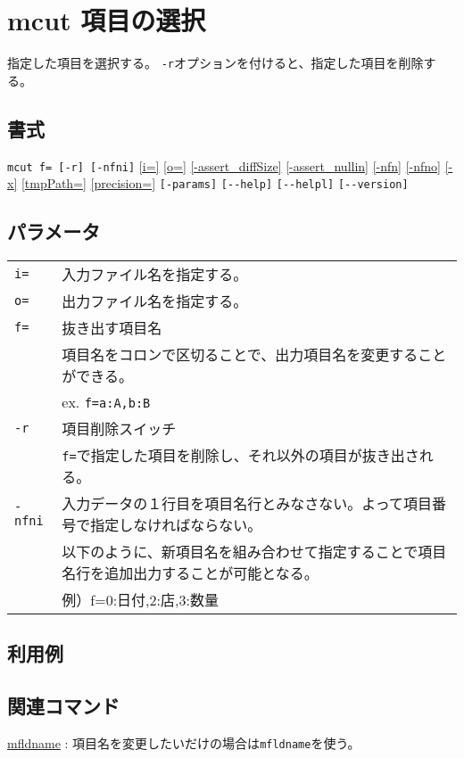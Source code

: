 
%

\section{mcut 項目の選択\label{sect:mcut}}
指定した項目を選択する。
\verb|-r|オプションを付けると、指定した項目を削除する。

\subsection*{書式}
\verb|mcut f= [-r] [-nfni]|
\hyperref[sect:option_i]{[i=]}
\hyperref[sect:option_o]{[o=]}
\hyperref[sect:option_assert_diffSize]{[-assert\_diffSize]}
\hyperref[sect:option_assert_nullin]{[-assert\_nullin]}
\hyperref[sect:option_nfn]{[-nfn]} 
\hyperref[sect:option_nfno]{[-nfno]}  
\hyperref[sect:option_x]{[-x]}
\hyperref[sect:option_option_tmppath]{[tmpPath=]}
\hyperref[sect:option_precision]{[precision=]}
\verb|[-params]|
\verb|[--help]|
\verb|[--helpl]|
\verb|[--version]|\\

\subsection*{パラメータ}
\begin{table}[htbp]
{\small
\begin{tabular}{ll}
\verb|i=|    & 入力ファイル名を指定する。\\
\verb|o=|    & 出力ファイル名を指定する。\\
\verb|f=|    & 抜き出す項目名\\
             & 項目名をコロンで区切ることで、出力項目名を変更することができる。\\
             & ex. \verb|f=a:A,b:B| \\
\verb|-r|    & 項目削除スイッチ\\
             & \verb|f=|で指定した項目を削除し、それ以外の項目が抜き出される。\\
\verb|-nfni| & 入力データの１行目を項目名行とみなさない。よって項目番号で指定しなければならない。\\
             & 以下のように、新項目名を組み合わせて指定することで項目名行を追加出力することが可能となる。\\
             & 例）f=0:日付,2:店,3:数量 \\
\end{tabular} 
}
\end{table} 

\subsection*{利用例}

\subsection*{関連コマンド}
\hyperref[sect:mfldname]{mfldname} : 項目名を変更したいだけの場合は\verb|mfldname|を使う。

%

